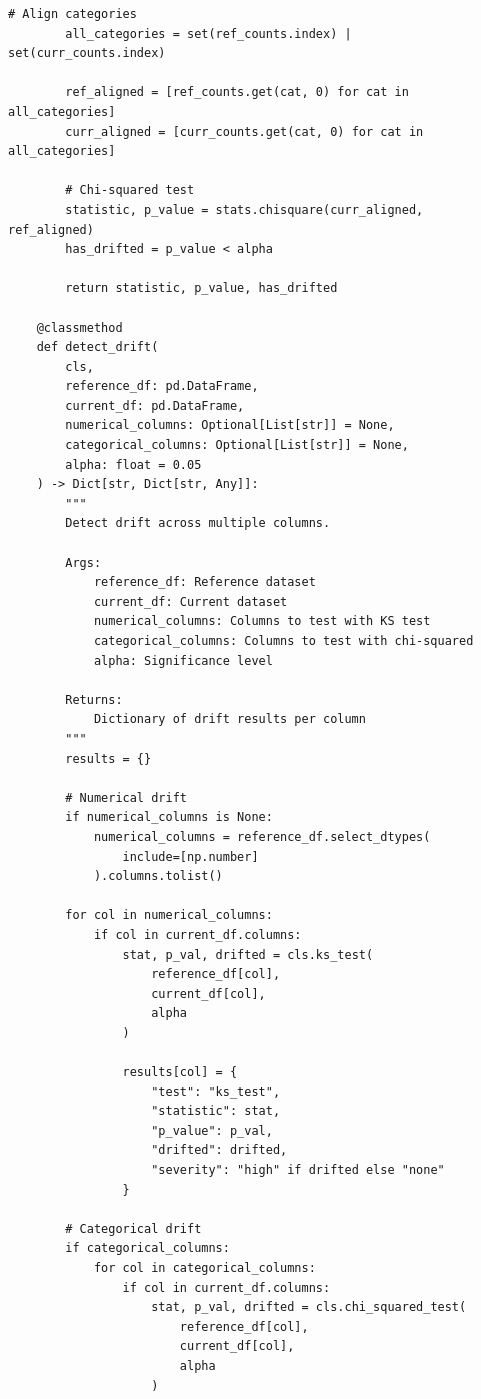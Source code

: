 \begin{lstlisting}[style=python, caption={Data quality metrics with statistical validation}]
        # Align categories
        all_categories = set(ref_counts.index) | set(curr_counts.index)

        ref_aligned = [ref_counts.get(cat, 0) for cat in all_categories]
        curr_aligned = [curr_counts.get(cat, 0) for cat in all_categories]

        # Chi-squared test
        statistic, p_value = stats.chisquare(curr_aligned, ref_aligned)
        has_drifted = p_value < alpha

        return statistic, p_value, has_drifted

    @classmethod
    def detect_drift(
        cls,
        reference_df: pd.DataFrame,
        current_df: pd.DataFrame,
        numerical_columns: Optional[List[str]] = None,
        categorical_columns: Optional[List[str]] = None,
        alpha: float = 0.05
    ) -> Dict[str, Dict[str, Any]]:
        """
        Detect drift across multiple columns.

        Args:
            reference_df: Reference dataset
            current_df: Current dataset
            numerical_columns: Columns to test with KS test
            categorical_columns: Columns to test with chi-squared
            alpha: Significance level

        Returns:
            Dictionary of drift results per column
        """
        results = {}

        # Numerical drift
        if numerical_columns is None:
            numerical_columns = reference_df.select_dtypes(
                include=[np.number]
            ).columns.tolist()

        for col in numerical_columns:
            if col in current_df.columns:
                stat, p_val, drifted = cls.ks_test(
                    reference_df[col],
                    current_df[col],
                    alpha
                )

                results[col] = {
                    "test": "ks_test",
                    "statistic": stat,
                    "p_value": p_val,
                    "drifted": drifted,
                    "severity": "high" if drifted else "none"
                }

        # Categorical drift
        if categorical_columns:
            for col in categorical_columns:
                if col in current_df.columns:
                    stat, p_val, drifted = cls.chi_squared_test(
                        reference_df[col],
                        current_df[col],
                        alpha
                    )


\end{lstlisting}
